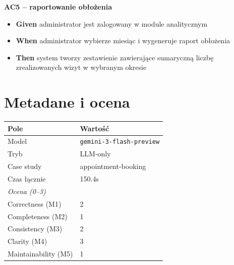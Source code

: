\documentclass[12pt,a4paper]{article}
\begin{document}
\begin{description}[leftmargin=1.5cm, labelwidth=1cm, labelsep=0.5cm]
\vspace{0.5cm}

\textbf{AC5 -- raportowanie obłożenia}
\begin{itemize}[itemsep=2pt]
    \item \textbf{Given} administrator jest zalogowany w module analitycznym
    \item \textbf{When} administrator wybierze miesiąc i wygeneruje raport obłożenia
    \item \textbf{Then} system tworzy zestawienie zawierające sumaryczną liczbę zrealizowanych wizyt w wybranym okresie
\end{itemize}
\end{description}


\section{Metadane i ocena}

\begin{table}[h]
\begin{tabular}{ll}
\toprule
\textbf{Pole} & \textbf{Wartość} \\
\midrule
Model & \texttt{gemini-3-flash-preview} \\
Tryb & LLM-only \\
Case study & appointment-booking \\
Czas łącznie & 150.4s \\
\midrule
\textit{Ocena (0--3)} & \\
\midrule
Correctness (M1) & 2 \\
Completeness (M2) & 1 \\
Consistency (M3) & 2 \\
Clarity (M4) & 3 \\
Maintainability (M5) & 1 \\
\bottomrule
\end{tabular}
\end{table}
\end{document}
